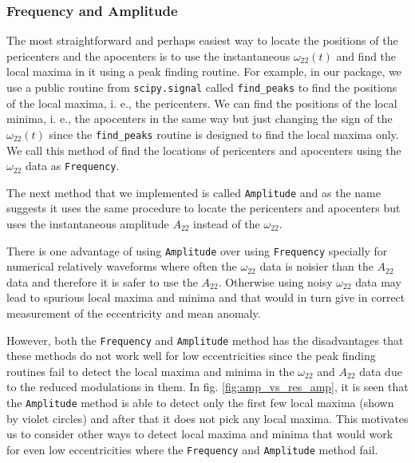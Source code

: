 \documentclass[aps,prd,amsmath,floats,floatfix, twocolumn,
superscriptaddress,nofootinbib,showpacs]{revtex4-1}
\newcommand{\mAmp}{\texttt{Amplitude}}
\newcommand{\mFreq}{\texttt{Frequency}}
\begin{document}
\subsubsection{Frequency and Amplitude}
\label{sec:frequency-and-amplitude}
The most straightforward and perhaps easiest way to locate the positions of the
pericenters and the apocenters is to use the instantaneous
$\omega_{22}(t)$ and find the local maxima in it using a peak finding
routine. For example, in our package, we use a public routine from
\texttt{scipy.signal} called \texttt{find\_peaks} to find the positions
of the local maxima, i. e., the pericenters. We can find the positions
of the local minima, i. e., the apocenters in the same way but just
changing the sign of the $\omega_{22}(t)$ since the
\texttt{find\_peaks} routine is designed to find the local maxima
only. We call this method of find the locations of pericenters and
apocenters using the $\omega_{22}$ data as \mFreq{}.

The next method that we implemented is called \mAmp{} and
as the name suggests it uses the same procedure to locate the
pericenters and apocenters but uses the instantaneous amplitude
$A_{22}$ instead of the $\omega_{22}$.

There is one advantage of using \mAmp{} over using
\mFreq{} specially for numerical relatively waveforms where
often the $\omega_{22}$ data is noisier than the $A_{22}$ data and
therefore it is safer to use the $A_{22}$. Otherwise using noisy
$\omega_{22}$ data may lead to spurious local maxima and minima and
that would in turn give in correct measurement of the eccentricity and
mean anomaly.

However, both the \mFreq{} and \mAmp{} method has the disadvantages
that these methods do not work well for low eccentricities since the
peak finding routines fail to detect the local maxima and minima in
the $\omega_{22}$ and $A_{22}$ data due to the reduced modulations in
them. In fig. \ref{fig:amp_vs_res_amp}, it is seen that the \mAmp{}
method is able to detect only the first few local maxima (shown by violet
circles) and after that it does not pick any local maxima. This
motivates us to consider other ways to detect local maxima and minima
that would work for even low eccentricities where the \mFreq{} and
\mAmp{} method fail.
\end{document}
